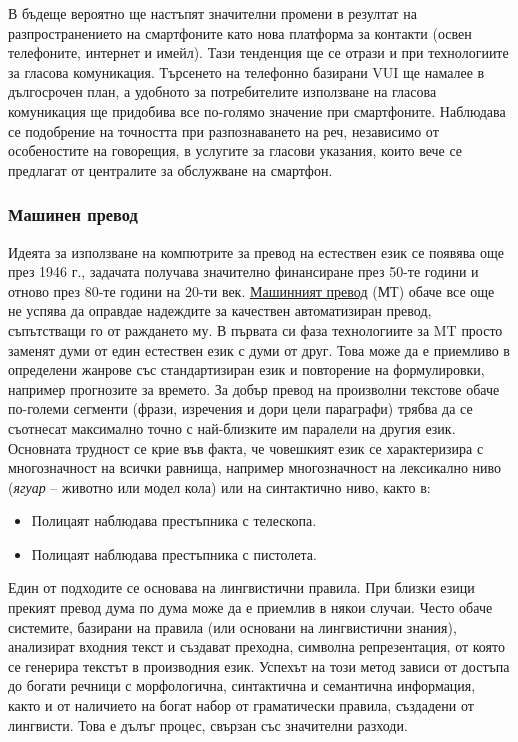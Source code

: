 \documentclass[]{../../metanetpaper}
\begin{document}
\begin{multicols}{2}
В бъдеще вероятно ще настъпят значителни промени в
 резултат на разпространението на смартфоните като
 нова платформа за контакти (освен телефоните, интернет и имейл).
Тази тенденция ще се отрази и при технологиите за
 гласова комуникация. Търсенето на
 телефонно базирани VUI ще намалее в дългосрочен
 план, а удобното за потребителите използване на гласова комуникация ще придобива все по-голямо значение при смартфоните. Наблюдава се подобрение на
 точността при разпознаването на реч, независимо от особеностите на
 говорещия, в услугите за гласови указания, които вече се предлагат от централите за обслужване на смартфон.

\subsubsection{Машинен превод}

Идеята за използване на компютрите за превод
 на естествен език се появява още през 1946 г.,
 задачата получава значително финансиране през 50-те години и отново през 80-те години на 20-ти век. \uline{Машинният превод} (МТ) обаче все още не успява да оправдае надеждите за качествен автоматизиран превод, съпътстващи го от раждането му.
В първата си фаза технологиите за MT просто заменят думи от един естествен език с думи от друг. Това може да
 е приемливо в определени жанрове със стандартизиран език и повторение на формулировки, например прогнозите за времето.
 За добър превод на произволни текстове обаче
 по-големи  сегменти (фрази, изречения и дори цели параграфи) трябва да се съотнесат максимално точно с най-близките им паралели на другия
 език. Основната трудност се крие във факта, че
 човешкият език се характеризира с многозначност на 
всички равнища,
 например
 многозначност на лексикално ниво ({\it ягуар} – животно
 или модел кола) или на
 синтактично ниво, както в:

\begin{itemize}
\item Полицаят наблюдава престъпника с телескопа.
\item Полицаят наблюдава престъпника с пистолета.
\end{itemize}

Един от подходите се основава на лингвистични правила.
 При близки езици прекият превод дума по дума може да е приемлив в някои случаи. Често обаче системите,
 базирани на правила (или основани на лингвистични знания),
 анализират входния текст и създават преходна, символна
 репрезентация, от която се генерира текстът в
 производния език. Успехът на този метод зависи от
 достъпа до богати речници с морфологична, синтактична
 и семантична информация, както и от наличието на
 богат набор от граматически правила, създадени от лингвисти.
 Това е дълъг процес, свързан със значителни разходи.


\end{multicols}
\end{document}
